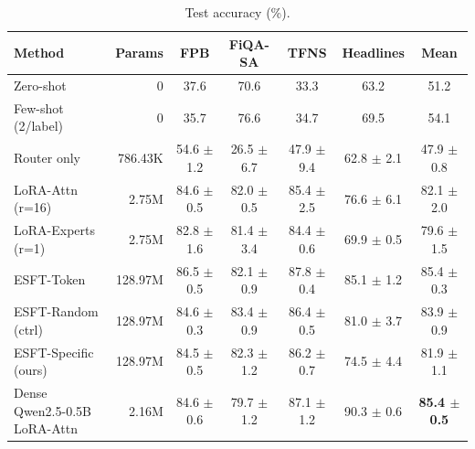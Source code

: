 \begin{table}[t]
\centering
\caption{Test accuracy (\%).}
\label{tab:acc}
\begin{tabular}{l r c c c c c}
\toprule
\textbf{Method} & \textbf{Params} & \textbf{FPB} & \textbf{FiQA-SA} & \textbf{TFNS} & \textbf{Headlines} & \textbf{Mean} \\
\midrule
Zero-shot & 0 & 37.6 & 70.6 & 33.3 & 63.2 & 51.2 \\
Few-shot (2/label) & 0 & 35.7 & 76.6 & 34.7 & 69.5 & 54.1 \\
Router only & 786.43K & 54.6 $\pm$ 1.2 & 26.5 $\pm$ 6.7 & 47.9 $\pm$ 9.4 & 62.8 $\pm$ 2.1 & 47.9 $\pm$ 0.8 \\
LoRA-Attn (r=16) & 2.75M & 84.6 $\pm$ 0.5 & 82.0 $\pm$ 0.5 & 85.4 $\pm$ 2.5 & 76.6 $\pm$ 6.1 & 82.1 $\pm$ 2.0 \\
LoRA-Experts (r=1) & 2.75M & 82.8 $\pm$ 1.6 & 81.4 $\pm$ 3.4 & 84.4 $\pm$ 0.6 & 69.9 $\pm$ 0.5 & 79.6 $\pm$ 1.5 \\
ESFT-Token & 128.97M & 86.5 $\pm$ 0.5 & 82.1 $\pm$ 0.9 & 87.8 $\pm$ 0.4 & 85.1 $\pm$ 1.2 & 85.4 $\pm$ 0.3 \\
ESFT-Random (ctrl) & 128.97M & 84.6 $\pm$ 0.3 & 83.4 $\pm$ 0.9 & 86.4 $\pm$ 0.5 & 81.0 $\pm$ 3.7 & 83.9 $\pm$ 0.9 \\
ESFT-Specific (ours) & 128.97M & 84.5 $\pm$ 0.5 & 82.3 $\pm$ 1.2 & 86.2 $\pm$ 0.7 & 74.5 $\pm$ 4.4 & 81.9 $\pm$ 1.1 \\
Dense Qwen2.5-0.5B LoRA-Attn & 2.16M & 84.6 $\pm$ 0.6 & 79.7 $\pm$ 1.2 & 87.1 $\pm$ 1.2 & 90.3 $\pm$ 0.6 & \textbf{85.4 $\pm$ 0.5} \\
\bottomrule
\end{tabular}
\end{table}